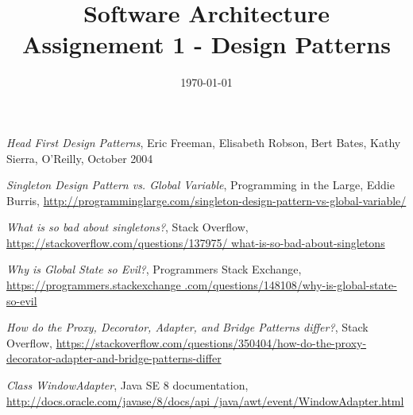 \documentclass[a4paper, 11pt]{article}
\title{
	\textbf{Software Architecture}\\
    \Large{Assignement 1 - Design Patterns}
}
\date{\today}
\begin{document}
\maketitle
\newpage

\tableofcontents
\newpage





\begin{thebibliography}{10}

 \emph{Head First Design Patterns}, Eric Freeman, Elisabeth Robson, Bert Bates, Kathy Sierra, O'Reilly, October 2004

 \emph{Singleton Design Pattern vs. Global Variable}, Programming in the Large, Eddie Burris, \href{http://programminglarge.com/singleton-design-pattern-vs-global-variable/}{http://programminglarge.com/singleton-design-pattern-vs-global-variable/}

 \emph{What is so bad about singletons?}, Stack Overflow, \href{https://stackoverflow.com/questions/137975/what-is-so-bad-about-singletons}{https://stackoverflow.com/questions/137975/ what-is-so-bad-about-singletons}

 \emph{Why is Global State so Evil?}, Programmers Stack Exchange, \href{https://programmers.stackexchange.com/questions/148108/why-is-global-state-so-evil}{https://programmers.stackexchange .com/questions/148108/why-is-global-state-so-evil}

 \emph{How do the Proxy, Decorator, Adapter, and Bridge Patterns differ?}, Stack Overflow, \href{https://stackoverflow.com/questions/350404/how-do-the-proxy-decorator-adapter-and-bridge-patterns-differ}{https://stackoverflow.com/questions/350404/how-do-the-proxy-decorator-adapter-and-bridge-patterns-differ}

 \emph{Class WindowAdapter}, Java SE 8 documentation, \href{http://docs.oracle.com/javase/8/docs/api/java/awt/event/WindowAdapter.html}{http://docs.oracle.com/javase/8/docs/api /java/awt/event/WindowAdapter.html}
\end{thebibliography}
\end{document}
